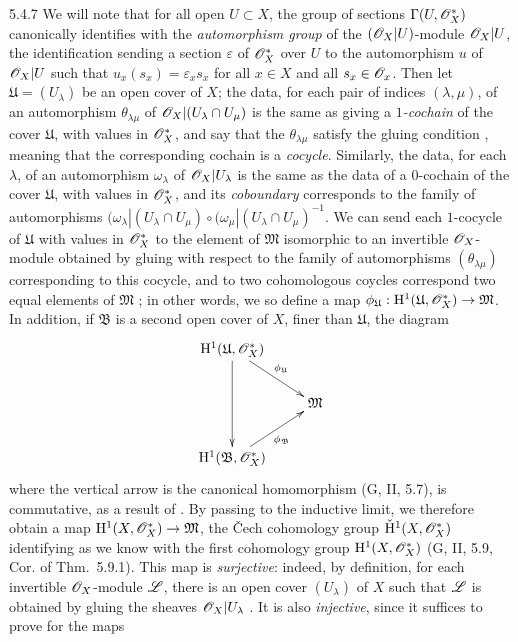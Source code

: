 \begin{env}{5.4.7}
We will note that for all open $U\subset X$, the group of sections
$\Gamma(U,\mathscr{O}_X^*)$ canonically identifies with the \emph{automorphism group} of
the $(\mathscr{O}_X|U)$-module $\mathscr{O}_X|U$, the identification sending a section
$\varepsilon$ of $\mathscr{O}_X^*$ over $U$ to the automorphism $u$ of $\mathscr{O}_X|U$ such
that $u_x(s_x)=\varepsilon_x s_x$ for all $x\in X$ and all $s_x\in\mathscr{O}_x$. Then
let $\mathfrak{U}=(U_\lambda)$ be an open cover of $X$; the data, for each pair
of indices $(\lambda,\mu)$, of an automorphism $\theta_{\lambda\mu}$ of
$\mathscr{O}_X|(U_\lambda\cap U_\mu)$ is the same as giving a \emph{$1$-cochain} of the
cover $\mathfrak{U}$, with values in $\mathscr{O}_X^*$, and say that the
$\theta_{\lambda\mu}$ satisfy the gluing condition , meaning
that the corresponding cochain is a \emph{cocycle}. Similarly, the data, for
each $\lambda$, of an automorphism $\omega_\lambda$ of $\mathscr{O}_X|U_\lambda$ is the
same as the data of a $0$-cochain of the cover $\mathfrak{U}$, with values in
$\mathscr{O}_X^*$, and its \emph{coboundary} corresponds to the family of automorphisms
$(\omega_\lambda|(U_\lambda\cap U_\mu)
  \circ(\omega_\mu|(U_\lambda\cap U_\mu)^{-1}$. We can send each $1$-cocycle of
$\mathfrak{U}$ with values in $\mathscr{O}_X^*$ to the element of $\mathfrak{M}$
isomorphic to an invertible $\mathscr{O}_X$-module obtained by gluing with respect to
the family of automorphisms $(\theta_{\lambda\mu})$ corresponding to this
cocycle, and to two cohomologous coycles correspond two equal elements of
$\mathfrak{M}$ ; in other words, we so define a map
$\phi_\mathfrak{U}:\mathrm{H}^1(\mathfrak{U},\mathscr{O}_X^*)\to\mathfrak{M}$. In addition, if
$\mathfrak{B}$ is a second open cover of $X$, finer than $\mathfrak{U}$, the
diagram
\[
  \xymatrix{
    \HH^1(\mathfrak{U},\OO_X^*)\ar[rd]^{\vphi_\mathfrak{U}}\ar[dd]\\
    & \mathfrak{M}\\
    \HH^1(\mathfrak{B},\OO_X^*)\ar[ur]_{\vphi_\mathfrak{B}}
  }
\]
where the vertical arrow is the canonical homomorphism (G, II, 5.7), is
commutative, as a result of . By passing to the inductive
limit, we therefore obtain a map $\mathrm{H}^1(X,\mathscr{O}_X^*)\to\mathfrak{M}$, the \v Cech
cohomology group $\check{\mathrm{H}}^1(X,\mathscr{O}_X^*)$ identifying as we know with the
first cohomology group $\mathrm{H}^1(X,\mathscr{O}_X^*)$ (G, II, 5.9, Cor. of Thm.~5.9.1). This
map is \emph{surjective}: indeed, by definition, for each invertible
$\mathscr{O}_X$-module $\mathscr{L}$, there is an open cover $(U_\lambda)$ of $X$ such that
$\mathscr{L}$ is obtained by gluing the sheaves $\mathscr{O}_X|U_\lambda$ .
It is also \emph{injective}, since it suffices to prove for the maps

\end{env}
